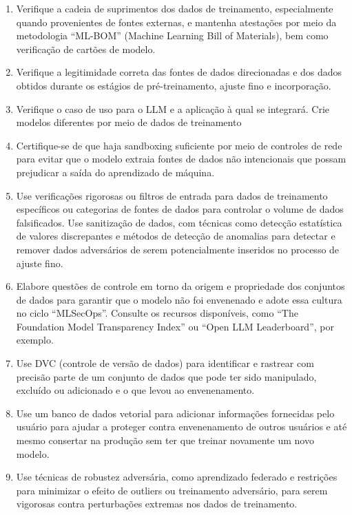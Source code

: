 \documentclass[
]{article}
\providecommand{\tightlist}{%
  \setlength{\itemsep}{0pt}\setlength{\parskip}{0pt}}
\begin{document}
\begin{enumerate}
\def\labelenumi{\arabic{enumi}.}
\tightlist
\item
  Verifique a cadeia de suprimentos dos dados de treinamento,
  especialmente quando provenientes de fontes externas, e mantenha
  atestações por meio da metodologia ``ML-BOM'' (Machine Learning Bill
  of Materials), bem como verificação de cartões de modelo.
\item
  Verifique a legitimidade correta das fontes de dados direcionadas e
  dos dados obtidos durante os estágios de pré-treinamento, ajuste fino
  e incorporação.
\item
  Verifique o caso de uso para o LLM e a aplicação à qual se integrará.
  Crie modelos diferentes por meio de dados de treinamento
\item
  Certifique-se de que haja sandboxing suficiente por meio de controles
  de rede para evitar que o modelo extraia fontes de dados não
  intencionais que possam prejudicar a saída do aprendizado de máquina.
\item
  Use verificações rigorosas ou filtros de entrada para dados de
  treinamento específicos ou categorias de fontes de dados para
  controlar o volume de dados falsificados. Use sanitização de dados,
  com técnicas como detecção estatística de valores discrepantes e
  métodos de detecção de anomalias para detectar e remover dados
  adversários de serem potencialmente inseridos no processo de ajuste
  fino.
\item
  Elabore questões de controle em torno da origem e propriedade dos
  conjuntos de dados para garantir que o modelo não foi envenenado e
  adote essa cultura no ciclo ``MLSecOps''. Consulte os recursos
  disponíveis, como ``The Foundation Model Transparency Index'' ou
  ``Open LLM Leaderboard'', por exemplo.
\item
  Use DVC (controle de versão de dados) para identificar e rastrear com
  precisão parte de um conjunto de dados que pode ter sido manipulado,
  excluído ou adicionado e o que levou ao envenenamento.
\item
  Use um banco de dados vetorial para adicionar informações fornecidas
  pelo usuário para ajudar a proteger contra envenenamento de outros
  usuários e até mesmo consertar na produção sem ter que treinar
  novamente um novo modelo.
\item
  Use técnicas de robustez adversária, como aprendizado federado e
  restrições para minimizar o efeito de outliers ou treinamento
  adversário, para serem vigorosas contra perturbações extremas nos
  dados de treinamento.


\end{enumerate}
\end{document}
